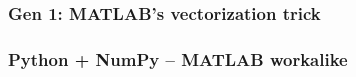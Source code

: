 \documentclass[
    xcolor={svgnames,dvipsnames},
    hyperref={colorlinks, citecolor=DeepPink4, linkcolor=DarkRed, urlcolor=DarkBlue}
    ]{beamer}  %
\newcommand{\1}{\mathbbm 1}
\begin{document}
\begin{frame}
    \frametitle{Gen 1: MATLAB's vectorization trick}
    
    \begin{figure}
       \begin{center} %
       \end{center}
    \end{figure}

    
\end{frame}


\begin{frame}
    \frametitle{Python + NumPy -- MATLAB workalike}

    \begin{figure}
       \begin{center} %
       \end{center}
    \end{figure}


\end{frame}
\end{document}

